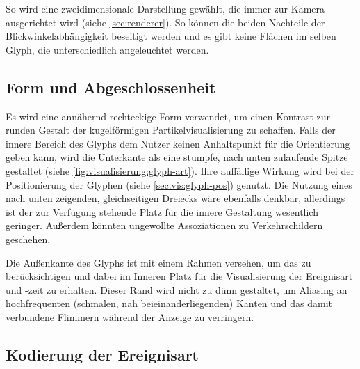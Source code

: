 So wird eine zweidimensionale Darstellung gewählt, die immer zur Kamera ausgerichtet wird (siehe \autoref{sec:renderer}). So können die beiden Nachteile der Blickwinkelabhängigkeit beseitigt werden und es gibt keine Flächen im selben Glyph, die unterschiedlich angeleuchtet werden.


\subsection*{Form und Abgeschlossenheit}
Es wird eine annähernd rechteckige Form verwendet, um einen Kontrast zur runden Gestalt der kugelförmigen Partikelvisualisierung zu schaffen. Falls der innere Bereich des Glyphs dem Nutzer keinen Anhaltspunkt für die Orientierung geben kann, wird die Unterkante als eine stumpfe, nach unten zulaufende Spitze gestaltet (siehe \autoref{fig:visualisierung:glyph-art}). Ihre auffällige Wirkung wird bei der Positionierung der Glyphen (siehe \autoref{sec:vis:glyph-pos}) genutzt. Die Nutzung eines nach unten zeigenden, gleichseitigen Dreiecks wäre ebenfalls denkbar, allerdings ist der zur Verfügung stehende Platz für die innere Gestaltung wesentlich geringer. Außerdem könnten ungewollte Assoziationen zu Verkehrschildern geschehen.

Die Außenkante des Glyphs ist mit einem Rahmen versehen, um das  zu berücksichtigen und dabei im Inneren Platz für die Visualisierung der Ereignisart und -zeit zu erhalten. Dieser Rand wird nicht zu dünn gestaltet, um Aliasing an hochfrequenten (schmalen, nah beieinanderliegenden) Kanten und das damit verbundene Flimmern während der Anzeige zu verringern.

\subsection*{Kodierung der Ereignisart}

